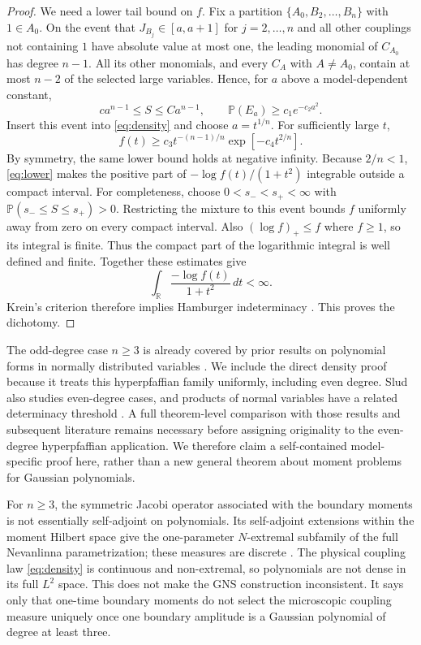 \documentclass[11pt,a4paper]{article}
\theoremstyle{definition}
\theoremstyle{remark}
\newcommand{\Pp}{\mathbb{P}}
\newcommand{\R}{\mathbb{R}}
\begin{document}
\begin{proof}
We need a lower tail bound on $f$.  Fix a partition
$\{A_0,B_2,\ldots,B_n\}$ with $1\in A_0$.  On the event that
$J_{B_j}\in[a,a+1]$ for $j=2,\ldots,n$ and all other couplings not containing $1$ have
absolute value at most one, the leading monomial of $C_{A_0}$ has degree $n-1$.  All its
other monomials, and every $C_A$ with $A\ne A_0$, contain at most $n-2$ of the selected
large variables.  Hence, for $a$ above a model-dependent constant,
\[
 c a^{n-1}\le S\le C a^{n-1},\qquad
 \Pp(E_a)\ge c_1e^{-c_2a^2}.
\]
Insert this event into \eqref{eq:density} and choose $a=t^{1/n}$.  For sufficiently large
$t$,
\begin{equation}
 f(t)\ge c_3t^{-(n-1)/n}\exp[-c_4t^{2/n}].
 \label{eq:lower}
\end{equation}
By symmetry, the same lower bound holds at negative infinity.
Because $2/n<1$, \eqref{eq:lower} makes the positive part of
$-\log f(t)/(1+t^2)$ integrable outside a compact interval.
For completeness, choose $0<s_-<s_+<\infty$ with
$\mathbb P(s_-\le S\le s_+)>0$.  Restricting the mixture to this event bounds $f$
uniformly away from zero on every compact interval.  Also $(\log f)_+\le f$ where
$f\ge1$, so its integral is finite.  Thus the compact part of the logarithmic integral
is well defined and finite.
Together these estimates give
\[
 \int_{\R}\frac{-\log f(t)}{1+t^2}\,dt<\infty.
\]
Krein's criterion therefore implies Hamburger indeterminacy
\citep{Krein1945,Stoyanov2000}. This proves the dichotomy.
\end{proof}

The odd-degree case $n\ge3$ is already covered by prior results on polynomial forms
in normally distributed variables \citep{Slud1993}.  We include the direct density proof
because it treats this hyperpfaffian family uniformly, including even degree.  Slud also
studies even-degree cases, and products of normal variables have a related determinacy
threshold \citep{StoyanovLinDasGupta2014}.  A full theorem-level comparison with those
results and subsequent literature remains necessary before assigning originality to the
even-degree hyperpfaffian application.  We therefore claim a self-contained model-specific
proof here, rather than a new general theorem about moment problems for Gaussian
polynomials.

For $n\ge3$, the symmetric Jacobi operator associated with the boundary moments is not
essentially self-adjoint on polynomials.  Its self-adjoint extensions within the moment
Hilbert space give the one-parameter $N$-extremal subfamily of the full Nevanlinna
parametrization; these measures are discrete \citep{Akhiezer1965,Simon1998}.
The physical coupling law \eqref{eq:density} is continuous and non-extremal, so polynomials
are not dense in its full $L^2$ space.  This does not make the GNS construction inconsistent.
It says only that one-time boundary moments do not select the microscopic coupling measure
uniquely once one boundary amplitude is a Gaussian polynomial of degree at least three.
\end{document}
